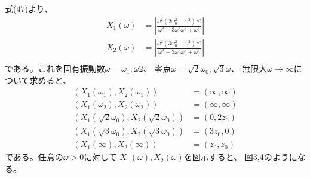 \documentclass[a4paper]{jsarticle}
\begin{document}
\subsection{}
式(47)より、
\begin{equation}
  \begin{aligned}
    X_1(\omega) &= \left|\frac{\omega^2 (2 \omega_0^2 - \omega^2) z0}{\omega^4 - 3 \omega^2 \omega_0^2 + \omega_0^4}\right| \\
    X_2(\omega) &= \left|\frac{\omega^2 (3 \omega_0^2 - \omega^2) z0}{\omega^4 - 3 \omega^2 \omega_0^2 + \omega_0^4}\right| \\
  \end{aligned}
\end{equation}
である。これを固有振動数$\omega = \omega_1, \omega2$、
零点$\omega = \sqrt{2} \omega_0, \sqrt{3} \omega$、
無限大$\omega \to \infty$について求めると、
\begin{align}
  \left(X_1(\omega_1), X_2(\omega_1)\right) &= (\infty, \infty) \\
  \left(X_1(\omega_2), X_2(\omega_2)\right) &= (\infty, \infty) \\
  \left(X_1(\sqrt{2} \omega_0), X_2(\sqrt{2} \omega_0)\right) &= (0, 2 z_0) \\
  \left(X_1(\sqrt{3} \omega_0), X_2(\sqrt{3} \omega_0)\right) &= (3 z_0, 0) \\
  \left(X_1(\infty), X_2(\infty)\right) &= (z_0, z_0)
\end{align}
である。任意の$\omega > 0$に対して
$X_1(\omega), X_2(\omega)$を図示すると、
図3,4のようになる。
\end{document}
